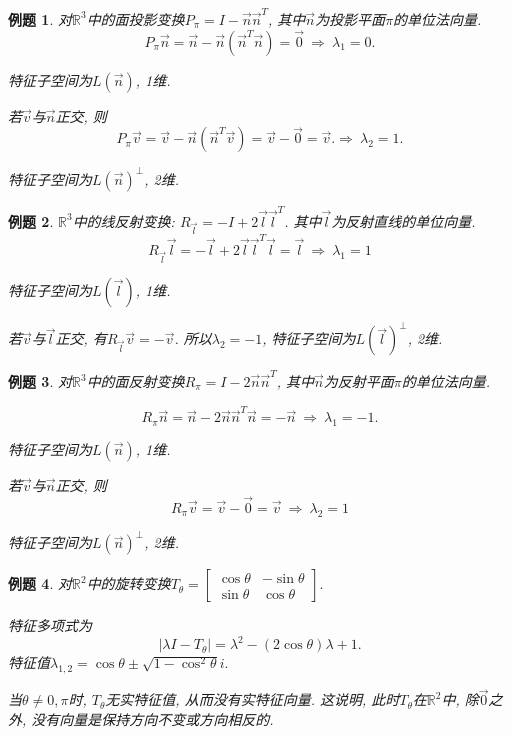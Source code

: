\documentclass[a4paper]{book}
\newtheorem{eg}{例题}[chapter]
\begin{document}
\begin{eg}
对$\mathbb{R}^3$中的面投影变换$P_{\pi}=I-\vec{n}\vec{n}^T$, 其中$\vec{n}$为投影平面$\pi$的单位法向量.
$$P_{\pi}\vec{n}=\vec{n}-\vec{n}(\vec{n}^T\vec{n})=\vec{0}\ \Rightarrow \ \lambda_1=0.$$

特征子空间为$L(\vec{n})$, 1维.

若$\vec{v}$与$\vec{n}$正交, 则$$P_{\pi}\vec{v}=\vec{v}-\vec{n}(\vec{n}^T\vec{v})=\vec{v}-\vec{0}=\vec{v}. \Rightarrow \ \lambda_2=1.$$

特征子空间为$L(\vec{n})^{\bot}$, 2维.

\end{eg}

\begin{eg}
$\mathbb{R}^3$中的线反射变换: $R_{\vec{l}}=-I+2\vec{l}\vec{l}^T$. 其中$\vec{l}$为反射直线的单位向量.
$$R_{\vec{l}}\vec{l}=-\vec{l}+2\vec{l}\vec{l}^T\vec{l}=\vec{l}\ \Rightarrow \  \lambda_1=1$$

特征子空间为$L(\vec{l})$, 1维.

若$\vec{v}$与$\vec{l}$正交, 有$R_{\vec{l}}\vec{v}=-\vec{v}$. 所以$\lambda_2=-1$, 特征子空间为$L(\vec{l})^{\bot}$, 2维.
\end{eg}

\begin{eg}
对$\mathbb{R}^3$中的面反射变换$R_{\pi}=I-2\vec{n}\vec{n}^T$, 其中$\vec{n}$为反射平面$\pi$的单位法向量.

$$R_{\pi}\vec{n}=\vec{n}-2\vec{n}\vec{n}^T\vec{n}=-\vec{n}\ \Rightarrow \ \lambda_1=-1.$$

特征子空间为$L(\vec{n})$, 1维.

若$\vec{v}$与$\vec{n}$正交, 则$$R_{\pi}\vec{v}=\vec{v}-\vec{0}=\vec{v}\ \Rightarrow \ \lambda_2=1$$

特征子空间为$L(\vec{n})^{\bot}$, 2维.

\end{eg}

\begin{eg}
对$\mathbb{R}^2$中的旋转变换$T_{\theta}=\begin{bmatrix} \cos\theta&-\sin\theta\\ \sin\theta&\cos\theta\end{bmatrix}.$

特征多项式为
$$|\lambda I-T_{\theta}|=\lambda^2-(2\cos\theta)\lambda +1.$$
特征值$\lambda_{1,2}=\cos\theta\pm\sqrt{1-\cos^2\theta}i.$

当$\theta\not=0,\pi$时, $T_{\theta}$无实特征值, 从而没有实特征向量. 这说明, 此时$T_{\theta}$在$\mathbb{R}^2$中, 除$\vec{0}$之外, 没有向量是保持方向不变或方向相反的.
\end{eg}
\end{document}
